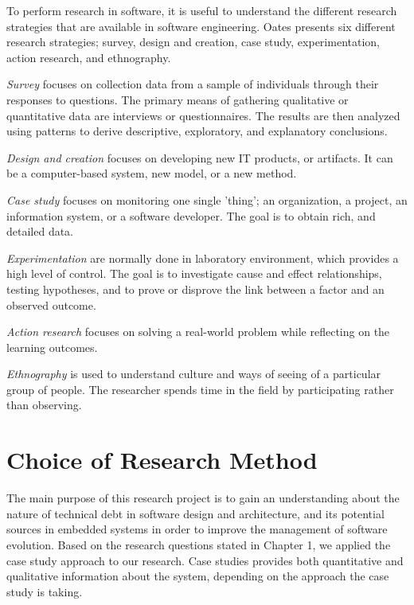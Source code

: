 To perform research in software, it is useful to understand the different research strategies that are available in software engineering. Oates\cite{Oates:2006:RIS:1202299} presents six different research strategies; survey, design and creation, case study, experimentation, action research, and ethnography. 

\textit{{Survey}} focuses on collection data from a sample of individuals through their responses to questions. The primary means of gathering qualitative or quantitative data are interviews or questionnaires. The results are then analyzed using patterns to derive descriptive, exploratory, and explanatory conclusions. 

\textit{{Design and creation}} focuses on developing new IT products, or artifacts. It can be a computer-based system, new model, or a new method. 

\textit{{Case study}} focuses on monitoring one single 'thing'; an organization, a project, an information system, or a software developer. The goal is to obtain rich, and detailed data. 

\textit{{Experimentation}} are normally done in laboratory environment, which provides a high level of control. The goal is to investigate cause and effect relationships, testing hypotheses, and to prove or disprove the link between a factor and an observed outcome. 

\textit{{Action research}} focuses on solving a real-world problem while reflecting on the learning outcomes. 

\textit{{Ethnography}} is used to understand culture and ways of seeing of a particular group of people. The researcher spends time in the field by participating rather than observing.





\section{Choice of Research Method}
\label{sec:choiceofmethod}
The main purpose of this research project is to gain an understanding about the nature of technical debt in software design and architecture, and its potential sources in embedded systems in order to improve the management of software evolution. Based on the research questions stated in Chapter 1, we applied the case study approach to our research. Case studies provides both quantitative and qualitative information about the system\cite{Oates:2006:RIS:1202299}, depending on the approach the case study is taking.


